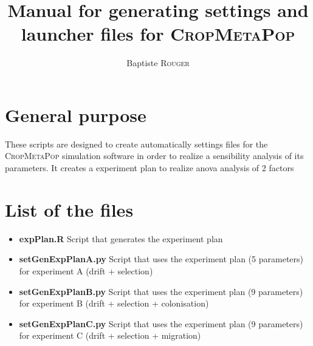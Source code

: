 \documentclass[10pt,a4paper]{article}
\title{Manual for generating settings and launcher files for \textsc{CropMetaPop}}
\author{Baptiste \textsc{Rouger}}
\begin{document}
\maketitle
\section{General purpose}
These scripts are designed to create automatically settings files for the \textsc{CropMetaPop} simulation software in order to realize a sensibility analysis of its parameters.
It creates a experiment plan to realize anova analysis of 2 factors


\section{List of the files}
\begin{itemize}
        \item \textbf{expPlan.R} Script that generates the experiment plan
        \item \textbf{setGenExpPlanA.py} Script that uses the experiment plan (5 parameters) for experiment A (drift + selection)
        \item \textbf{setGenExpPlanB.py} Script that uses the experiment plan (9 parameters) for experiment B (drift + selection + colonisation)
        \item \textbf{setGenExpPlanC.py} Script that uses the experiment plan (9 parameters) for experiment C (drift + selection + migration)
    \end{itemize}
\end{document}
